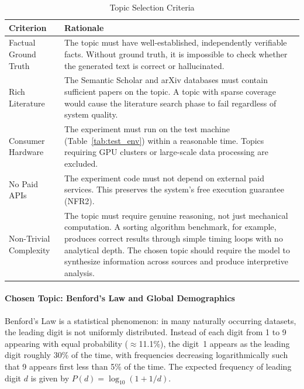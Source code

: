 \begin{table}[htbp]
    \centering
    \caption{Topic Selection Criteria}
    \label{tab:topic_criteria}
    \begin{tabularx}{\textwidth}{l X}
        \toprule
        \textbf{Criterion} & \textbf{Rationale} \\
        \midrule
        Factual Ground Truth & The topic must have well-established, independently verifiable facts. Without ground truth, it is impossible to check whether the generated text is correct or hallucinated. \\
        \addlinespace
        Rich Literature & The Semantic Scholar and arXiv databases must contain sufficient papers on the topic. A topic with sparse coverage would cause the literature search phase to fail regardless of system quality. \\
        \addlinespace
        Consumer Hardware & The experiment must run on the test machine (Table~\ref{tab:test_env}) within a reasonable time. Topics requiring GPU clusters or large-scale data processing are excluded. \\
        \addlinespace
        No Paid APIs & The experiment code must not depend on external paid services. This preserves the system's free execution guarantee (NFR2). \\
        \addlinespace
        Non-Trivial Complexity & The topic must require genuine reasoning, not just mechanical computation. A sorting algorithm benchmark, for example, produces correct results through simple timing loops with no analytical depth. The chosen topic should require the model to synthesize information across sources and produce interpretive analysis. \\
        \bottomrule
    \end{tabularx}
\end{table}

\paragraph{Chosen Topic: Benford's Law and Global Demographics}
Benford's Law is a statistical phenomenon: in many naturally occurring datasets, the leading digit is not uniformly distributed.
Instead of each digit from 1 to 9 appearing with equal probability ($\approx$11.1\%), the digit~1 appears as the leading digit roughly 30\% of the time, with frequencies decreasing logarithmically such that 9 appears first less than 5\% of the time.
The expected frequency of leading digit $d$ is given by $P(d) = \log_{10}(1 + 1/d)$.

